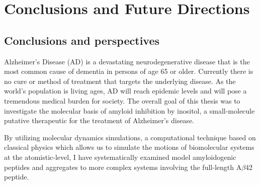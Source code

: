 \chapter{Conclusions and Future Directions}







\section{Conclusions and perspectives}
Alzheimer's Disease (AD) is a devastating neurodegenerative disease that is the most common cause of dementia in persons of age 65 or older. Currently there is no cure or method of treatment that targets the underlying disease.  As the world's population is living ages, AD will reach epidemic levels and will pose a tremendous medical burden for society. The overall goal of this thesis was to investigate the molecular basis of amyloid inhibition by inositol, a small-molecule putative therapeutic for the treatment of Alzheimer's disease. 

By utilizing molecular dynamics simulations, a computational technique based on classical physics which allows us to simulate the motions of biomolecular systems at the atomistic-level, I have systematically examined model amyloidogenic peptides and aggregates to more complex systems involving the full-length A$\beta$42 peptide. 

